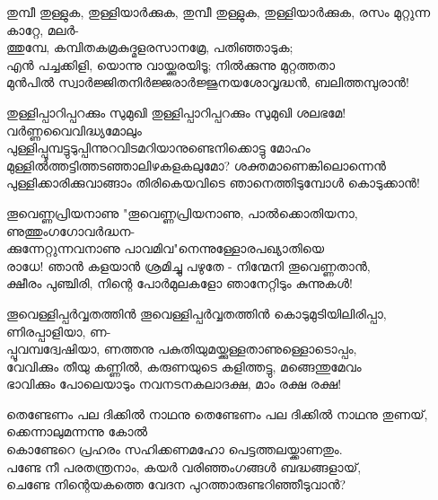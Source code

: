 \begin{enumerate}


\begin{slokam}{\VSv}{\KND}{തുമ്പീ തുള്ളുക, തുള്ളിയാർക്കുക,}
തുമ്പീ തുള്ളുക, തുള്ളിയാർക്കുക, രസം മുറ്റുന്ന കാറ്റേ, മലർ-\\
ത്തുമ്പേ, കമ്പിതകമ്രകുദ്മളരസാനമ്രേ, പതിഞ്ഞാടുക;\\
എൻ പച്ചക്കിളി, യൊന്നു വായ്ക്കുരയിടൂ; നിൽക്കുന്നു മുറ്റത്തതാ\\
മുൻപിൽ സ്വാർജ്ജിതനിർജ്ജരാർജ്ജുനയശോവൃദ്ധൻ, ബലിത്തമ്പുരാൻ!

\end{slokam}


\begin{slokam}{\VSr}{\HM}{തുള്ളിപ്പാറിപ്പറക്കും സുമുഖി}
തുള്ളിപ്പാറിപ്പറക്കും സുമുഖി ശലഭമേ! വർണ്ണവൈവിദ്ധ്യമോലും\\
പുള്ളിപ്പൂമ്പട്ടുടുപ്പിന്നുറവിടമറിയാനുണ്ടെനിക്കൊട്ടു മോഹം\\
മുള്ളിൽത്തട്ടിത്തടഞ്ഞാലിഴകളകലുമോ? ശക്തമാണെങ്കിലൊന്നെൻ\\
പുള്ളിക്കാരിക്കുവാങ്ങാം തിരികെയവിടെ ഞാനെത്തിടുമ്പോൾ കൊടുക്കാൻ!
\end{slokam}




\begin{slokam}{\VSv}{\VKG}{തൂവെണ്ണപ്രിയനാണു}
"തൂവെണ്ണപ്രിയനാണു, പാൽക്കൊതിയനാ, ണുത്തുംഗഗോവർദ്ധന-\\
ക്കുന്നേറ്റുന്നവനാണു പാവമിവ"നെന്നുള്ളോരപഖ്യാതിയെ\\
രാധേ! ഞാൻ കളയാൻ ശ്രമിച്ചു പഴുതേ - നിന്മേനി തൂവെണ്ണതാൻ,\\
ക്ഷീരം പുഞ്ചിരി, നിന്റെ പോർമുലകളോ ഞാനേറ്റിടും കുന്നുകള്‍!
\end{slokam}




\begin{slokam}{\VSr}{\VKG}{തൂവെള്ളിപ്പർവ്വതത്തിൻ}
തൂവെള്ളിപ്പർവ്വതത്തിൻ കൊടുമുടിയിലിരിപ്പാ, ണിരപ്പാളിയാ, ണ-\\
പ്പൂവമ്പദ്വേഷിയാ, ണത്തനു പകുതിയുമയ്ക്കുള്ളതാണുള്ളൊടൊപ്പം,\\
വേവിക്കും തീയു കണ്ണിൽ, കരുണയുടെ കളിത്തട്ടു, മങ്ങെന്തുമേവം\\
ഭാവിക്കും പോലെയാടും നവനടനകലാദക്ഷ, മാം രക്ഷ രക്ഷ!
\end{slokam}


\begin{slokam}{\VSv}{\TMV}{തെണ്ടേണം പല ദിക്കിൽ നാഥനു}
തെണ്ടേണം പല ദിക്കിൽ നാഥനു തുണയ്‌, ക്കെന്നാലുമന്നന്നു കോൽ\\
കൊണ്ടേറെ പ്രഹരം സഹിക്കണമഹോ പെട്ടത്തലയ്ക്കാണതും.\\
പണ്ടേ നീ പരതന്ത്രനാം, കയർ വരിഞ്ഞംഗങ്ങള്‍ ബദ്ധങ്ങളായ്‌,\\
ചെണ്ടേ നിന്റെയകത്തെ വേദന പുറത്താരുണ്ടറിഞ്ഞീടുവാൻ?


\end{slokam}
\end{enumerate}
